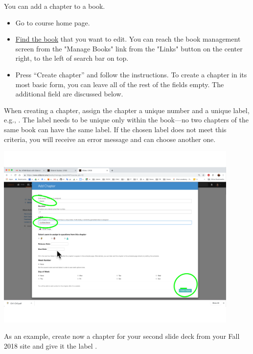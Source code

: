 \begin{gram}
\label{guide:chapter::create}
You can add a chapter to a book.  
\begin{itemize}
\item Go to course home page.
\item \href{guide::author::go-book-management}{Find the book} that you
  want to edit.  You can reach the book management screen from the
  "Manage Books" link from the "Links" button on the center right, to
  the left of search bar on top.

\item  Press ``Create chapter'' and follow the instructions.  To create a chapter in its most basic form, you can leave all of the rest of the fields empty.  The additional field are discussed below.
\end{itemize}
%

When creating a chapter, assign the chapter a unique number and a unique label, e.g., .  
%
The label needs to be unique only within the book---no two chapters of
the same book can have the same label.
%
If the chosen label does not meet this criteria, you will receive an error message and can choose another one.

\includegraphics[width=0.9\textwidth]{author/media/create-chapter.pdf}
\end{gram}

\begin{exercise}
As an example, create now a chapter for your second slide deck from
your Fall 2018 site and give it the label .
\end{exercise}


